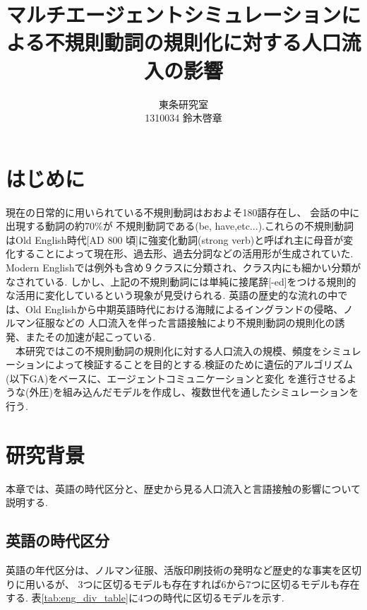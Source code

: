 \documentclass[10.5pt, a4j, twocolumn]{jsarticle}
\begin{document}
\title{マルチエージェントシミュレーションによる不規則動詞の規則化に対する人口流入の影響\\       }

\date{}
\author{東条研究室 \\ 1310034 鈴木啓章}

\maketitle %
\thispagestyle{fancy}


\section{はじめに}\label{sec:intro}
現在の日常的に用いられている不規則動詞はおおよそ180語存在し、
会話の中に出現する動詞の約70\%が
不規則動詞である(be, have,etc...)\cite{pinker}.これらの不規則動詞はOld English時代[AD 800 頃]に強変化動詞(strong verb)と呼ばれ主に母音が変化することによって現在形、過去形、過去分詞などの活用形が生成されていた.
Modern Englishでは例外も含め９クラスに分類され、クラス内にも細かい分類がなされている\cite{pinker2}.
しかし、上記の不規則動詞には単純に接尾辞[-ed]をつける規則的な活用に変化しているという現象が見受けられる.
英語の歴史的な流れの中では、Old Englishから中期英語時代における海賊によるイングランドの侵略、ノルマン征服などの
人口流入を伴った言語接触により不規則動詞の規則化の誘発、またその加速が起こっている.\\
　本研究ではこの不規則動詞の規則化に対する人口流入の規模、頻度をシミュレーションによって検証することを目的とする.検証のために遺伝的アルゴリズム\cite{iba_ga}(以下GA)をベースに、エージェントコミュニケーションと変化
を進行させるような(外圧)を組み込んだモデルを作成し、複数世代を通したシミュレーションを行う.

\section{研究背景}
本章では、英語の時代区分と、歴史から見る人口流入と言語接触の影響について説明する.
\subsection{英語の時代区分}
英語の年代区分は、ノルマン征服、活版印刷技術の発明など歴史的な事実を区切りに用いるが、
3つに区切るモデルも存在すれば6から7つに区切るモデルも存在する.
表\ref{tab:eng_div_table}に4つの時代に区切るモデル\cite{english_div}を示す.
\end{document}
